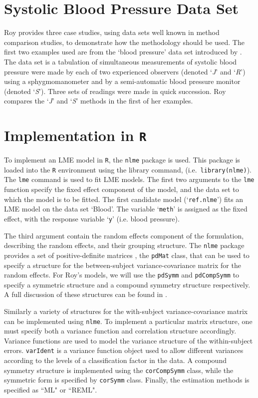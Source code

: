 \documentclass[12pt, a4paper]{report}
\theoremstyle{plain}
\theoremstyle{definition}
\theoremstyle{remark}
\begin{document}
\section{Systolic Blood Pressure Data Set}

Roy provides three case studies, using data sets well known in method comparison studies, to demonstrate how the methodology should be used. The first two examples used are from the `blood pressure' data set introduced by \citet{BA99}. The data set is a tabulation of simultaneous measurements of systolic blood pressure were made by each of two experienced observers (denoted `\textit{J}' and `\textit{R}') using a sphygmomanometer and by a semi-automatic blood pressure monitor (denoted `\textit{S}'). Three sets of readings were made in quick succession. Roy compares the `\textit{J}' and `\textit{S}' methods in the first of her examples.

\section{Implementation in \texttt{R}}
To implement an LME model in \texttt{R}, the \texttt{nlme} package is used. This package is loaded into the \texttt{R} environment using the library command, (i.e.\ \texttt{library(nlme)}). The \texttt{lme} command is used to fit LME models. The first two arguments to the \texttt{lme} function specify the fixed effect component of the model, and the data set to which the model is to be fitted. The first candidate model (`\texttt{ref.nlme}') fits an LME model on the data set `Blood'. The variable `\texttt{meth}' is assigned as the fixed effect, with the response variable `\texttt{y}' (i.e. blood pressure).
			
The third argument contain the random effects component of the formulation, describing the random effects, and their grouping structure. The \texttt{nlme} package provides a set of positive-definite matrices , the \texttt{pdMat} class, that can be used to specify a structure for the between-subject variance-covariance matrix for the random effects. For Roy's models, we will use the \texttt{pdSymm} and \texttt{pdCompSymm} to specify a symmetric structure and a compound symmetry structure respectively. A full discussion of these structures can be found in \citet[pg. 158]{PB}.
			
Similarly a variety of structures for the with-subject variance-covariance matrix can be implemented using \texttt{nlme}. To implement a particular matrix structure, one must specify both a variance function and correlation structure accordingly. Variance functions are used to model the variance structure of the within-subject errors. \texttt{varIdent} is a variance function object used to allow different variances according to the levels of a classification factor in the data. A compound symmetry structure is implemented using the \texttt{corCompSymm} class, while the symmetric form is specified by \texttt{corSymm} class. Finally, the estimation methods is specified as ``ML" or ``REML".
\end{document}
